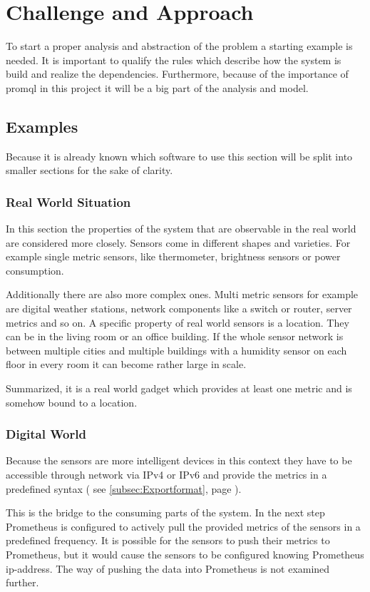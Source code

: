 \chapter{Challenge and Approach}
\label{chapter:bestandsaufnahme}
To start a proper analysis and abstraction of the problem a starting example is needed. It is important to qualify the rules which describe how the system is build and realize the dependencies. Furthermore, because of the importance of \gls{promql} in this project it will be a big part of the analysis and model.
\section{Examples}
Because it is already known which software to use this section will be split into smaller sections for the sake of clarity. 

\subsection{Real World Situation}
In this section the properties of the system that are observable in the real world are considered more closely. Sensors come in different shapes and varieties. For example single metric sensors, like thermometer, brightness sensors or power consumption. 

Additionally there are also more complex ones. Multi metric sensors for example are digital weather stations, network components like a switch or router, server metrics and so on. A specific property of real world sensors is a location. They can be in the living room or an office building. If the whole sensor network is between multiple cities and multiple buildings with a humidity sensor on each floor in every room it can become rather large in scale.

Summarized, it is a real world gadget which provides at least one metric and is somehow bound to a location.

\subsection{Digital World}
Because the sensors are more intelligent devices in this context they have to be accessible through network via \gls{IPv4} or \gls{IPv6} and provide the metrics in a predefined syntax ( see \cref{subsec:Exportformat}, page \pageref{subsec:Exportformat} ). 

This is the bridge to the consuming parts of the system. In the next step Prometheus is configured to actively pull the provided metrics of the sensors in a predefined frequency. It is possible for the sensors to push their metrics to Prometheus, but it would cause the sensors to be configured knowing  Prometheus \gls{ip-address}. The way of pushing the data into Prometheus is not examined further.

